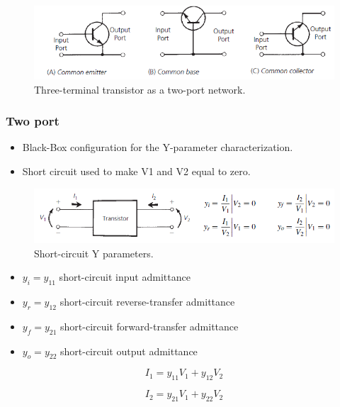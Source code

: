 \begin{figure} [H]
	\centering
	\includegraphics[width=\linewidth]{graphics/36.png}
	\caption{Three-terminal transistor as a two-port network.}
	\label{fig:36}
\end{figure}

\subsubsection{Two port}

\begin{itemize}
	\item Black-Box configuration for the Y-parameter characterization.
	\item Short circuit used to make V1 and V2 equal to zero.
\end{itemize}

\begin{figure} [H]
	\centering
	\includegraphics[width=\linewidth]{graphics/37.png}
	\caption{Short-circuit Y parameters.}
	\label{fig:37}
\end{figure}

\begin{itemize}
	\item $y_i = y_{11}$ short-circuit input admittance
	\item $y_r = y_{12}$ short-circuit reverse-transfer admittance
	\item $y_f = y_{21}$ short-circuit forward-transfer admittance
	\item $y_o = y_{22}$ short-circuit output admittance
\end{itemize}

\begin{equation}
I_1 = y_{11} V_1 + y_{12} V_2
\end{equation}

\begin{equation}
I_2 = y_{21} V_1 + y_{22} V_2
\end{equation}

